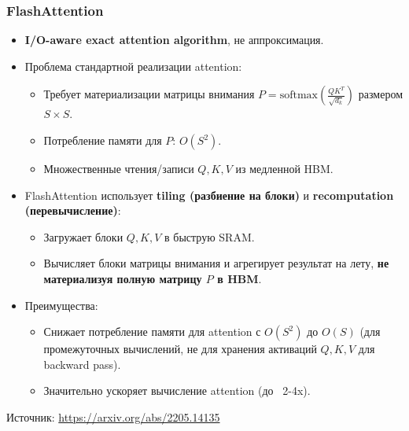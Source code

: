 \begin{frame}
  \frametitle{FlashAttention}
  \begin{itemize}
    \item \textbf{I/O-aware exact attention algorithm}, не аппроксимация.
    \item Проблема стандартной реализации attention:
      \begin{itemize}
        \item Требует материализации матрицы внимания $P = \text{softmax}(\frac{QK^T}{\sqrt{d_k}})$ размером $S \times S$.
        \item Потребление памяти для $P$: $O(S^2)$.
        \item Множественные чтения/записи $Q, K, V$ из медленной HBM.
      \end{itemize}
    \item FlashAttention использует \textbf{tiling (разбиение на блоки)} и \textbf{recomputation (перевычисление)}:
      \begin{itemize}
        \item Загружает блоки $Q, K, V$ в быструю SRAM.
        \item Вычисляет блоки матрицы внимания и агрегирует результат на лету, \textbf{не материализуя полную матрицу $P$ в HBM}.
      \end{itemize}
    \item Преимущества:
      \begin{itemize}
        \item Снижает потребление памяти для attention с $O(S^2)$ до $O(S)$ (для промежуточных вычислений, не для хранения активаций $Q,K,V$ для backward pass).
        \item Значительно ускоряет вычисление attention (до ~2-4x).
      \end{itemize}
  \end{itemize}
  \vspace{0.5cm}
  \begin{flushright}
    \tiny Источник: \url{https://arxiv.org/abs/2205.14135}
  \end{flushright}
\end{frame}


